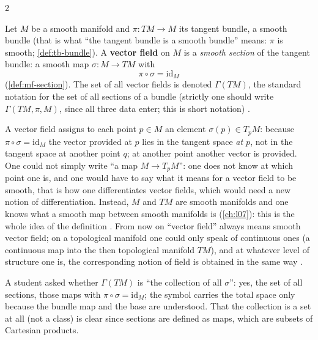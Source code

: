 \begin{paracol}{2}
\begin{definition}\label{def:rm-field}
Let $M$ be a smooth manifold and $\pi\colon TM\to M$ its tangent bundle, a smooth bundle (that is what ``the tangent bundle is a smooth bundle'' means: $\pi$ is smooth; \cref{def:tb-bundle}). A \textbf{vector field} on $M$ is a \emph{smooth section} of the tangent bundle: a smooth map $\sigma\colon M\to TM$ with
\[
  \pi\circ\sigma=\mathrm{id}_M
\]
(\cref{def:mf-section}). The set of all vector fields is denoted $\Gamma(TM)$, the standard notation for the set of all sections of a bundle (strictly one should write $\Gamma(TM,\pi,M)$, since all three data enter; this is short notation)          .
\end{definition}
A vector field assigns to each point $p\in M$ an element $\sigma(p)\in T_pM$: because $\pi\circ\sigma=\mathrm{id}_M$ the vector provided at $p$ lies in the tangent space \emph{at $p$}, not in the tangent space at another point $q$; at another point another vector is provided. One could not simply write ``a map $M\to T_pM$'': one does not know at which
point one is, and one would have to say what it means for a vector field to be smooth, that is how one differentiates vector fields, which would need a new notion of differentiation. Instead, $M$ and $TM$ are smooth manifolds and one knows what a smooth map between smooth manifolds is
(\cref{ch:l07}): this is the whole idea of the definition     .
From now on ``vector field'' always means smooth vector field; on a topological manifold one could only speak of continuous ones (a continuous map into the then topological manifold $TM$), and at whatever level of structure one is, the corresponding notion of field is obtained in the same way  .

\begin{coursenote}
A student asked whether $\Gamma(TM)$ is ``the collection of all $\sigma$'': yes, the set of all sections, those maps with $\pi\circ\sigma=\mathrm{id}_M$; the symbol carries the total space only because the bundle map and the base are understood. That the collection is a set at all (not a class) is clear since
sections are defined as maps, which are subsets of Cartesian products. 
\end{coursenote}


\end{paracol}
